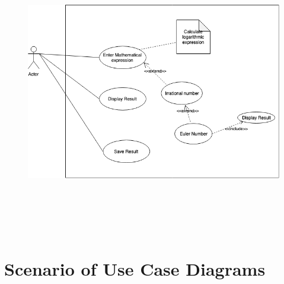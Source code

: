 \documentclass[12pt]{report}
\begin{document}

\begin{figure}[H]
	\begin{Center}
		\includegraphics[width=7.12in,height=4.9in]{./image7.png}
	\end{Center}
\end{figure}



\par


\vspace{\baselineskip}

\vspace{\baselineskip}

\vspace{\baselineskip}

\vspace{\baselineskip}

\vspace{\baselineskip}

\vspace{\baselineskip}

\vspace{\baselineskip}
\section*{Scenario of Use Case Diagrams}
\end{document}
